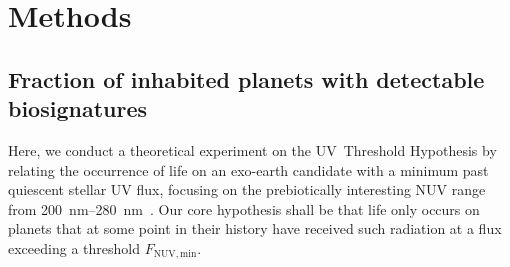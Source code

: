 \documentclass[twocolumn,twocolappendix,linenumbers]{aastex631}
\begin{document}

\section{Methods}
\label{sec:methods}

\subsection{Fraction of inhabited planets with detectable biosignatures}
%
%
Here, we conduct a theoretical experiment on the UV~Threshold Hypothesis by relating the occurrence of life on an exo-earth candidate with a minimum past quiescent stellar UV flux, focusing on the prebiotically interesting \gls{NUV} range from \SIrange{200}{280}{\nano\meter}~\citep{Ranjan2016}.
Our core hypothesis shall be that life only occurs on planets that at some point in their history have received such radiation at a flux exceeding a threshold $F_\mathrm{NUV, min}$.
\end{document}
